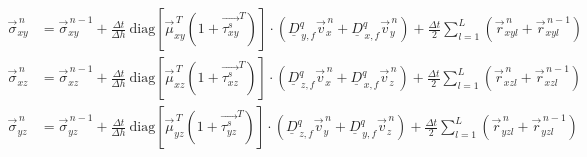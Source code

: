 \documentclass[pdftex,a4paper,parskip,listof=totoc,bibliography=totoc,onehalfspacing,12pt]{scrreprt}
\begin{document}
\begin{align*}
	\vec{\sigma}_{xy}^{\,n} &= \vec{\sigma}_{xy}^{\,n-1} + \frac{\Delta t}{\Delta h}~ \mathrm{diag} \left[ \vec{\mu}_{xy}^{\,T} (1+\vec{\tau^s_{xy}}^{T}) \right] \cdot \left( \underline{D}_{\,y,f}^q \vec{v}_x^{\,n} + \underline{D}_{\,x,f}^q \vec{v}_y^{\,n} \right) + \frac{\Delta t}{2} \sum_{l=1}^L \left( \vec{r}_{xyl}^{\,n} + \vec{r}_{xyl}^{\,n-1} \right)\\
	\vec{\sigma}_{xz}^{\,n} &= \vec{\sigma}_{xz}^{\,n-1} + \frac{\Delta t}{\Delta h}~ \mathrm{diag} \left[ \vec{\mu}_{xz}^{\,T} (1+\vec{\tau^s_{xz}}^{T}) \right] \cdot \left( \underline{D}_{\,z,f}^q \vec{v}_x^{\,n} + \underline{D}_{\,x,f}^q \vec{v}_z^{\,n} \right) + \frac{\Delta t}{2} \sum_{l=1}^L \left( \vec{r}_{xzl}^{\,n} + \vec{r}_{xzl}^{\,n-1} \right)\\
	\vec{\sigma}_{yz}^{\,n} &= \vec{\sigma}_{yz}^{\,n-1} + \frac{\Delta t}{\Delta h}~ \mathrm{diag} \left[ \vec{\mu}_{yz}^{\,T} (1+\vec{\tau^s_{yz}}^{T}) \right] \cdot \left( \underline{D}_{\,z,f}^q \vec{v}_y^{\,n} + \underline{D}_{\,y,f}^q \vec{v}_z^{\,n} \right) + \frac{\Delta t}{2} \sum_{l=1}^L \left( \vec{r}_{yzl}^{\,n} + \vec{r}_{yzl}^{\,n-1} \right)
\end{align*}
\end{document}

